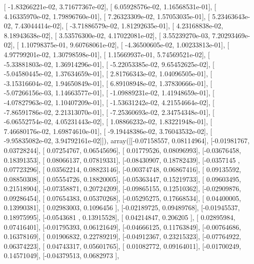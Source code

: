 \documentclass{article}
\begin{document}
       [ -1.83266221e-02,   3.71677367e-02],
       [  6.05928576e-02,   1.16568531e-01],
       [  4.16335970e-02,   1.79896760e-01],
       [  7.26323309e-02,   1.57053035e-01],
       [  5.23463643e-02,   7.43044414e-02],
       [ -3.71886579e-02,   1.81292635e-01],
       [  4.23168838e-02,   8.18943638e-02],
       [  3.53576300e-02,   4.17022081e-02],
       [  3.55239270e-03,   7.20293469e-02],
       [  1.10798375e-01,   9.60768061e-02],
       [ -4.36500605e-02,   1.00233813e-01],
       [  4.97799201e-02,   1.30798598e-01],
       [  1.15669937e-01,   5.74569521e-02],
       [ -5.33881803e-02,   1.36914296e-01],
       [ -5.22053385e-02,   9.65452625e-02],
       [ -5.04580445e-02,   1.37634659e-01],
       [  2.81766343e-02,   1.04096505e-01],
       [ -3.15316604e-02,   1.94650849e-01],
       [  6.89108948e-02,   1.37830666e-01],
       [ -5.07266156e-03,   1.14663577e-01],
       [ -1.09889231e-02,   1.41948659e-01],
       [ -4.07827963e-02,   1.10407209e-01],
       [ -1.53631242e-02,   4.21554664e-02],
       [ -7.86591786e-02,   2.21313070e-01],
       [ -7.25360693e-02,   2.34754348e-01],
       [ -6.06552754e-02,   4.05231443e-02],
       [  1.08866232e-02,   1.83221948e-01],
       [  7.46680176e-02,   1.69874610e-01],
       [ -9.19448386e-02,   3.76043532e-02],
       [ -9.95835082e-02,   3.94792161e-02]]), array([[-0.07158557,  0.08114964],
       [-0.01981767,  0.03728244],
       [ 0.07254767,  0.06545696],
       [ 0.01779526,  0.08096993],
       [-0.03676458,  0.18391353],
       [ 0.08066137,  0.07819331],
       [-0.08430907,  0.18782439],
       [-0.0357145 ,  0.07723296],
       [ 0.03562214,  0.08823146],
       [-0.00374748,  0.06867416],
       [ 0.09135592,  0.08850308],
       [ 0.05554726,  0.18820005],
       [-0.05363447,  0.15219733],
       [ 0.09603495,  0.21518904],
       [-0.07358871,  0.20724209],
       [-0.09865155,  0.12510362],
       [-0.02909876,  0.09286454],
       [ 0.07654383,  0.05370268],
       [-0.05295275,  0.17668534],
       [ 0.04400005,  0.13990381],
       [ 0.02983003,  0.1096456 ],
       [-0.02189725,  0.09489768],
       [-0.01945537,  0.18975995],
       [-0.0543681 ,  0.13915528],
       [ 0.04214847,  0.206205  ],
       [ 0.02895984,  0.07416401],
       [-0.01795393,  0.06121649],
       [-0.04666125,  0.11763849],
       [-0.00764686,  0.16378169],
       [ 0.01906832,  0.22789219],
       [-0.04912367,  0.23215323],
       [-0.07764922,  0.06374223],
       [ 0.04743317,  0.05601765],
       [ 0.01082772,  0.09164011],
       [-0.01700249,  0.14571049],
       [-0.04379513,  0.0682973 ],
\end{document}

